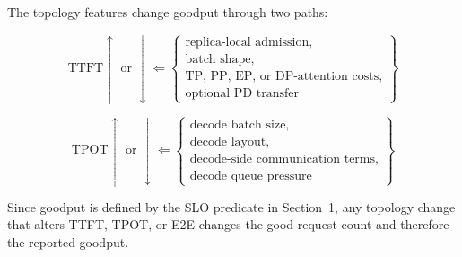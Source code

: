 The topology features change goodput through two paths:

\begin{equation*}
\mathrm{TTFT} \uparrow \text{ or } \downarrow
\Longleftarrow
\left\{
\begin{array}{l}
\text{replica-local admission}, \\
\text{batch shape}, \\
\text{TP, PP, EP, or DP-attention costs}, \\
\text{optional PD transfer}
\end{array}
\right\}
\end{equation*}

\begin{equation*}
\mathrm{TPOT} \uparrow \text{ or } \downarrow
\Longleftarrow
\left\{
\begin{array}{l}
\text{decode batch size}, \\
\text{decode layout}, \\
\text{decode-side communication terms}, \\
\text{decode queue pressure}
\end{array}
\right\}
\end{equation*}

Since goodput is defined by the SLO predicate in Section~1, any topology change
that alters TTFT, TPOT, or E2E changes the good-request count and therefore the
reported goodput.
